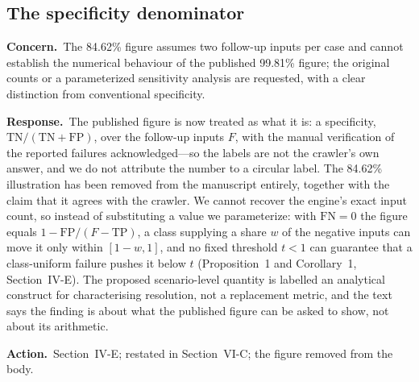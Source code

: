 \documentclass[10pt,letterpaper]{article}
\newcommand{\Concern}[1]{\par\smallskip\noindent\textbf{Concern.}\ #1\par}
\newcommand{\Response}[1]{\par\smallskip\noindent\textbf{Response.}\ #1\par}
\newcommand{\Action}[1]{\par\smallskip\noindent\textbf{Action.}\ #1\par}
\begin{document}
\subsection{The specificity denominator}
\Concern{The 84.62\% figure assumes two follow-up inputs per case and cannot
establish the numerical behaviour of the published 99.81\% figure; the original
counts or a parameterized sensitivity analysis are requested, with a clear
distinction from conventional specificity.}
\Response{The published figure is now treated as what it is: a specificity,
$\mathrm{TN}/(\mathrm{TN}+\mathrm{FP})$, over the follow-up inputs $F$, with the
manual verification of the reported failures acknowledged---so the labels are not
the crawler's own answer, and we do not attribute the number to a circular label.
The 84.62\% illustration has been removed from the manuscript entirely, together
with the claim that it agrees with the crawler. We cannot recover the engine's
exact input count, so instead of substituting a value we parameterize: with
$\mathrm{FN}=0$ the figure equals $1-\mathrm{FP}/(F-\mathrm{TP})$, a class
supplying a share $w$ of the negative inputs can move it only within $[1-w, 1]$,
and no fixed threshold $t<1$ can guarantee that a class-uniform failure pushes it
below $t$ (Proposition~1 and Corollary~1, Section~IV-E). The proposed
scenario-level quantity is labelled an analytical construct for characterising
resolution, not a replacement metric, and the text says the finding is about what
the published figure can be asked to show, not about its arithmetic.}
\Action{Section~IV-E; restated in Section~VI-C; the figure removed from the body.}
\end{document}
